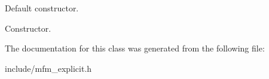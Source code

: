 Default constructor. 

Constructor. 

The documentation for this class was generated from the following file\+:\begin{DoxyCompactItemize}
\item 
include/mfm\+\_\+explicit.\+h\end{DoxyCompactItemize}
